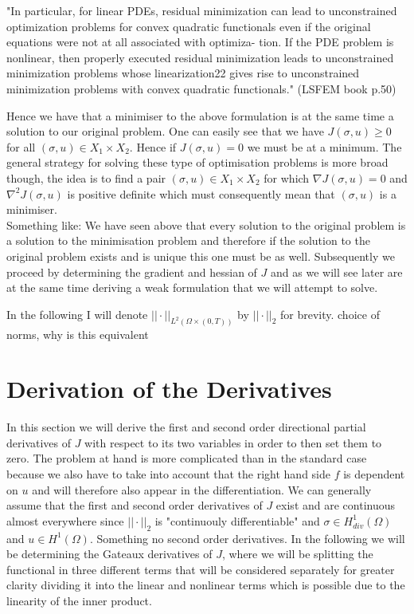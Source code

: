 \documentclass[../draft_1.tex]{subfiles}
\begin{document}
"In particular, for linear PDEs, residual minimization can lead to unconstrained optimization problems for convex quadratic functionals even if the original equations were not at all associated with optimiza- tion. If the PDE problem is nonlinear, then properly executed residual minimization leads to unconstrained minimization problems whose linearization22 gives rise to unconstrained minimization problems with convex quadratic functionals." (LSFEM book p.50)



Hence we have that a minimiser to the above formulation is at the same time a solution to our original problem. One can easily see that we have $J(\sigma, u) \geq 0$ for all $(\sigma, u) \in X_1 \times X_2$. Hence if $J(\sigma, u) = 0$ we must be at a minimum. The general strategy for solving these type of optimisation problems is more broad though, the idea is to find a pair $(\sigma, u) \in X_1 \times X_2$ for which $\nabla J(\sigma,u) = 0$  and $\nabla^2 J(\sigma, u)$ is positive definite which must consequently mean that $(\sigma, u)$ is a minimiser. \\
Something like: We have seen above that every solution to the original problem is a solution to the minimisation problem and therefore if the solution to the original problem exists and is unique this one must be as well. Subsequently we proceed by determining the gradient and hessian of $J$ and as we will see later are at the same time deriving a weak formulation that we will attempt to solve. 

In the following I will denote $|| \cdot ||_{L^2(\Omega \times (0,T))}$ by $|| \cdot ||_2$ for brevity. 
choice of norms, why is this equivalent




\section{Derivation of the Derivatives}

In this section we will derive the first and second order directional partial derivatives of $J$ with respect to its two variables in order to then set them to zero. The problem at hand is more complicated than in the standard case because we also have to take into account that the right hand side $f$ is dependent on $u$ and will therefore also appear in the differentiation. We can generally assume that the first and second order derivatives of $J$ exist and are continuous almost everywhere since $|| \cdot ||_2$ is "continuouly differentiable" and $\sigma \in H_{div}^1(\Omega)$ and $u \in H^1(\Omega)$. Something no second order derivatives. In the following we will be determining the Gateaux derivatives of $J$, where we will be splitting the functional in three different terms that will be considered separately for greater clarity dividing it into the linear and nonlinear terms which is possible due to the linearity of the inner product. 
\end{document}

